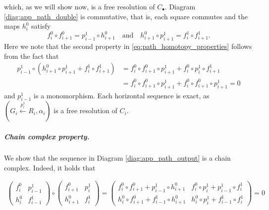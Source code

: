 \documentclass[11pt]{article}
\newcommand{\ignore}[1]{}
\begin{document}
which, as we will show now, is a free resolution of $C_\bullet$.
%
Diagram \eqref{diag:app_path_double} is commutative, that is, each square commutes and the maps $h^0_i$ satisfy
\begin{equation}
\label{eq:path_homotopy_properties}
    f^0_i \circ f^0_{i+1} = p^1_{i-1} \circ h^0_{i+1} \quad \text{and} \quad h^0_{i+1}\circ p^1_{i+1} = f^1_{i} \circ f^1_{i+1}.
\end{equation}
Here we note that the second property in \eqref{eq:path_homotopy_properties} follows from the fact that
\begin{equation*}
\begin{aligned}
p_{i-1}^1\circ (h^0_{i+1}\circ p^1_{i+1}+f^1_{i} \circ f^1_{i+1})&=f_{i}^0\circ f_{i+1}^0\circ p_{i+1}^1+f_i^0\circ p_i^1\circ f_{i+1}^1 \\ &=f_{i}^0\circ f_{i+1}^0\circ p_{i+1}^1+f_i^0\circ f_{i+1}^0\circ p_{i+1}^1=0
\end{aligned}
\end{equation*}
and $p_{i-1}^1$ is a monomorphism. Each horizontal sequence is exact, as $(G_i\xleftarrow{p^1_i} R_i,\alpha_i)$ is a free resolution of $C_i$. 
%
\subparagraph{Chain complex property.} We show that the sequence in Diagram \eqref{diag:app_path_output} is a chain complex. Indeed, it holds that 
\ignore{
\begin{align*}
\begin{pmatrix}f^0_i & p^1_{i-1} \\ h^0_i & f^1_{i-1} \end{pmatrix}\circ \begin{pmatrix}f^0_{i+1} & p^1_{i} \\ h^0_{i+1} & f^1_{i} \end{pmatrix}=\begin{pmatrix}f^0_{i}\circ f^0_{i+1}+p^1_{i-1}\circ h^0_{i+1} & h^0_i\circ f^0_{i+1}+f^1_{i-1}\circ h^0_{i+1} \\ f^0_i\circ p^1_i+p^1_{i-1}\circ f^1_i & h^0_i\circ p^1_i+f^1_{i-1}\circ f^1_i \end{pmatrix} = 0
\end{align*}
}
\begin{align*}
\begin{pmatrix}f^0_i & p^1_{i-1} \\ h^0_i & f^1_{i-1} \end{pmatrix}\circ \begin{pmatrix}f^0_{i+1} & p^1_{i} \\ h^0_{i+1} & f^1_{i} \end{pmatrix}=\begin{pmatrix}f^0_{i}\circ f^0_{i+1}+p^1_{i-1}\circ h^0_{i+1} & f^0_i\circ p^1_i+p^1_{i-1}\circ f^1_i \\ h^0_i\circ f^0_{i+1}+f^1_{i-1}\circ h^0_{i+1} & h^0_i\circ p^1_i+f^1_{i-1}\circ f^1_i \end{pmatrix} = 0
\end{align*}
\end{document}
